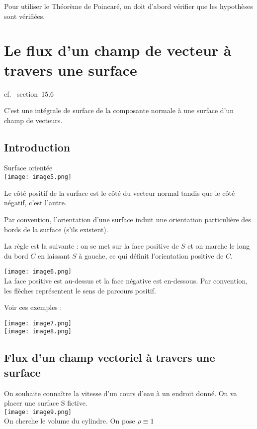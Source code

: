 Pour utiliser le Théorème de Poincaré, on doit d'abord vérifier que les hypothèses sont vérifiées.

\section{Le flux d'un champ de vecteur à travers une surface}

cf.~\cite{adams2013calculus} section~15.6

C'est une intégrale de surface de la composante normale à une surface d'un champ de vecteurs.

\subsection{Introduction}
 Surface orientée\\
 \texttt{[image: image5.png]}

 Le côté positif de la surface est le côté du vecteur normal tandis que le côté négatif, c'est l'autre.

 Par convention, l'orientation d'une surface induit une orientation particulière des bords de la surface (s'ils existent).

 La règle est la suivante : on se met sur la face positive de $S$ et on marche le long du bord $C$ en laissant $S$ à gauche, ce qui définit l'orientation positive de $C$.

 \texttt{[image: image6.png]}
 \\

 La face positive est au-dessus et la face négative est en-dessous. Par convention, les flèches représentent le sens de parcours positif.

 Voir ces exemples :

 \texttt{[image: image7.png]}\\
 \texttt{[image: image8.png]}

 \subsection{Flux d'un champ vectoriel à travers une surface}

 On souhaite connaître la vitesse d'un cours d'eau à un endroit donné. On va placer une surface S fictive.\\

 \texttt{[image: image9.png]} %
\\ On cherche le volume du cylindre. On pose $\rho \equiv 1$

